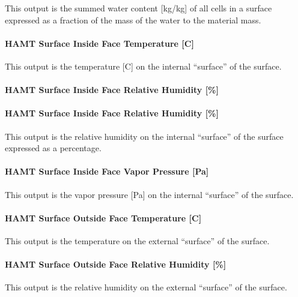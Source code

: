 This output is the summed water content {[}kg/kg{]} of all cells in a surface expressed as a fraction of the mass of the water to the material mass.

\paragraph{HAMT Surface Inside Face Temperature {[}C{]}}\label{hamt-surface-inside-face-temperature-c}

This output is the temperature {[}C{]} on the internal ``surface'' of the surface.

\paragraph{HAMT Surface Inside Face Relative Humidity {[}\%{]}}\label{hamt-surface-inside-face-relative-humidity}

\paragraph{HAMT Surface Inside Face Relative Humidity {[}\%{]}}\label{hamt-surface-inside-face-relative-humidity-1}

This output is the relative humidity on the internal ``surface'' of the surface expressed as a percentage.

\paragraph{HAMT Surface Inside Face Vapor Pressure {[}Pa{]}}\label{hamt-surface-inside-face-vapor-pressure-pa}

This output is the vapor pressure {[}Pa{]} on the internal ``surface'' of the surface.

\paragraph{HAMT Surface Outside Face Temperature {[}C{]}}\label{hamt-surface-outside-face-temperature-c}

This output is the temperature on the external ``surface'' of the surface.

\paragraph{HAMT Surface Outside Face Relative Humidity {[}\%{]}}\label{hamt-surface-outside-face-relative-humidity}

This output is the relative humidity on the external ``surface'' of the surface.

